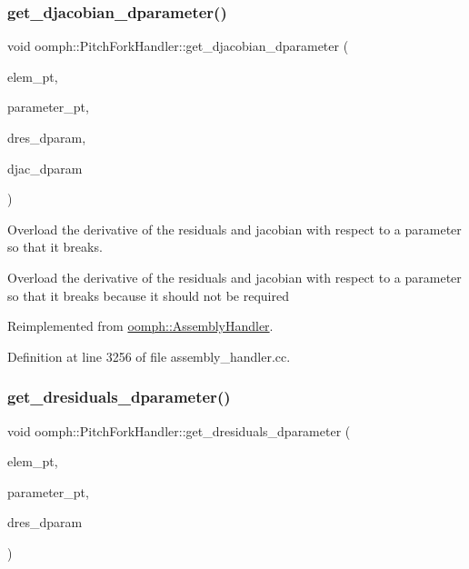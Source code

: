 \subsubsection{\texorpdfstring{get\+\_\+djacobian\+\_\+dparameter()}{get\_djacobian\_dparameter()}}
{\footnotesize\ttfamily void oomph\+::\+Pitch\+Fork\+Handler\+::get\+\_\+djacobian\+\_\+dparameter (\begin{DoxyParamCaption}\item[{\hyperlink{classoomph_1_1GeneralisedElement}{Generalised\+Element} $\ast$const \&}]{elem\+\_\+pt,  }\item[{double $\ast$const \&}]{parameter\+\_\+pt,  }\item[{\hyperlink{classoomph_1_1Vector}{Vector}$<$ double $>$ \&}]{dres\+\_\+dparam,  }\item[{\hyperlink{classoomph_1_1DenseMatrix}{Dense\+Matrix}$<$ double $>$ \&}]{djac\+\_\+dparam }\end{DoxyParamCaption})\hspace{0.3cm}{\ttfamily [virtual]}}



Overload the derivative of the residuals and jacobian with respect to a parameter so that it breaks. 

Overload the derivative of the residuals and jacobian with respect to a parameter so that it breaks because it should not be required 

Reimplemented from \hyperlink{classoomph_1_1AssemblyHandler_aefc0c13a65342806c167c5d53f014803}{oomph\+::\+Assembly\+Handler}.



Definition at line 3256 of file assembly\+\_\+handler.\+cc.

\mbox{\label{classoomph_1_1PitchForkHandler_a6510803afcbcfce1ae5b1c1c5d82a541}} 
\subsubsection{\texorpdfstring{get\+\_\+dresiduals\+\_\+dparameter()}{get\_dresiduals\_dparameter()}}
{\footnotesize\ttfamily void oomph\+::\+Pitch\+Fork\+Handler\+::get\+\_\+dresiduals\+\_\+dparameter (\begin{DoxyParamCaption}\item[{\hyperlink{classoomph_1_1GeneralisedElement}{Generalised\+Element} $\ast$const \&}]{elem\+\_\+pt,  }\item[{double $\ast$const \&}]{parameter\+\_\+pt,  }\item[{\hyperlink{classoomph_1_1Vector}{Vector}$<$ double $>$ \&}]{dres\+\_\+dparam }\end{DoxyParamCaption})\hspace{0.3cm}{\ttfamily [virtual]}}



